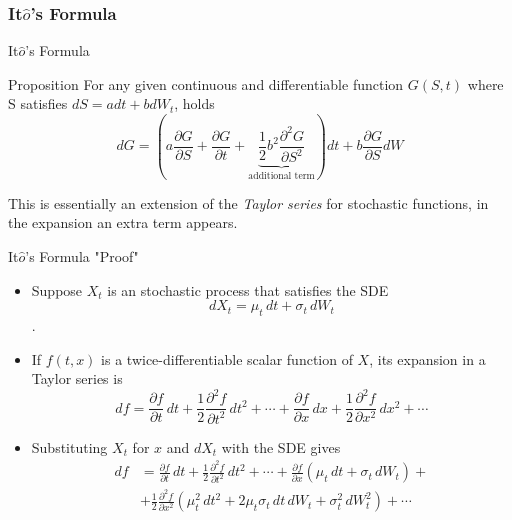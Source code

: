 \documentclass{beamer}
\begin{document}
\subsubsection{It$\hat{o}$'s Formula}
\begin{frame}{It$\hat{o}$'s Formula}
	\begin{block}{Proposition}
		For any given continuous and differentiable function $G(S,t)$ where S satisfies $dS=adt + bdW_t$, holds
		\begin{equation}
			dG = \left(a\frac{\partial G}{\partial S} + \frac{\partial G}{\partial t} + \underbrace{\frac{1}{2}b^2\frac{\partial^2 G}{\partial S^2}}_{\text{additional term}}\right)dt + b\frac{\partial G}{\partial S} dW
			\label{Eq:itos_lemma}
		\end{equation}
	\end{block}
	
	This is essentially an extension of the \emph{Taylor series} for stochastic functions, in the expansion an extra term appears.
\end{frame}

\begin{frame}{It$\hat{o}$'s Formula "Proof"}
	\begin{itemize}
	\item Suppose $X_t$ is an stochastic process that satisfies the SDE
	\begin{equation*}	
	dX_{t}=\mu _{t}\,dt+\sigma _{t}\,dW_{t}
	\end{equation*}.
	\item If $f(t,x)$ is a twice-differentiable scalar function of $X$, its expansion in a Taylor series is
	\begin{equation*}
	df={\frac {\partial f}{\partial t}}\,dt+{\frac {1}{2}}{\frac {\partial ^{2}f}{\partial t^{2}}}\,dt^{2}+\cdots +{\frac {\partial f}{\partial x}}\,dx+{\frac {1}{2}}{\frac {\partial ^{2}f}{\partial x^{2}}}\,dx^{2}+\cdots
	\end{equation*}
	\item Substituting $X_t$ for $x$ and $dX_t$ with the SDE gives
	\begin{equation*}
		\begin{aligned}
		df&={\frac {\partial f}{\partial t}}\,dt+{\frac {1}{2}}{\frac {\partial ^{2}f}{\partial t^{2}}}\,dt^{2}+\cdots +{\frac {\partial f}{\partial x}}(\mu _{t}\,dt+\sigma _{t}\,dW_{t})+\\
		&+{\frac {1}{2}}{\frac {\partial ^{2}f}{\partial x^{2}}}\left(\mu _{t}^{2}\,dt^{2}+2\mu _{t}\sigma _{t}\,dt\,dW_{t}+\sigma _{t}^{2}\,dW_{t}^{2}\right)+\cdots
		\end{aligned}
	\end{equation*}
\end{itemize}
\end{frame}
\end{document}
